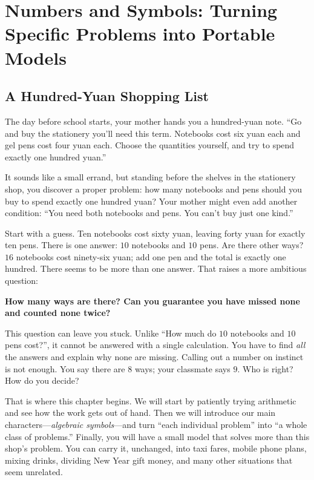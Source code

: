 \chapter{Numbers and Symbols: Turning Specific Problems into Portable Models}

\section{A Hundred-Yuan Shopping List}

The day before school starts, your mother hands you a hundred-yuan note. ``Go and buy the stationery you'll need this term. Notebooks cost six yuan each and gel pens cost four yuan each. Choose the quantities yourself, and try to spend exactly one hundred yuan.''

It sounds like a small errand, but standing before the shelves in the stationery shop, you discover a proper problem: how many notebooks and pens should you buy to spend exactly one hundred yuan? Your mother might even add another condition: ``You need both notebooks and pens. You can't buy just one kind.''

Start with a guess. Ten notebooks cost sixty yuan, leaving forty yuan for exactly ten pens. There is one answer: $10$ notebooks and $10$ pens. Are there other ways? $16$ notebooks cost ninety-six yuan; add one pen and the total is exactly one hundred. There seems to be more than one answer. That raises a more ambitious question:

\begin{center}
\textbf{How many ways are there? Can you guarantee you have missed none and counted none twice?}
\end{center}

This question can leave you stuck. Unlike ``How much do $10$ notebooks and $10$ pens cost?'', it cannot be answered with a single calculation. You have to find \emph{all} the answers and explain why none are missing. Calling out a number on instinct is not enough. You say there are $8$ ways; your classmate says $9$. Who is right? How do you decide?

That is where this chapter begins. We will start by patiently trying arithmetic and see how the work gets out of hand. Then we will introduce our main characters---\emph{algebraic symbols}---and turn ``each individual problem'' into ``a whole class of problems.'' Finally, you will have a small model that solves more than this shop's problem. You can carry it, unchanged, into taxi fares, mobile phone plans, mixing drinks, dividing New Year gift money, and many other situations that seem unrelated.

